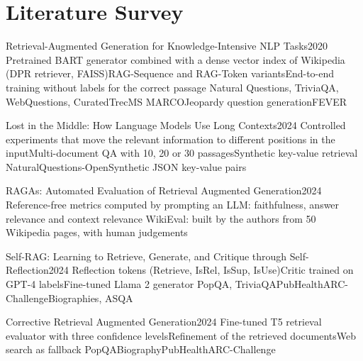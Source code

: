 \chapter{Literature Survey}\label{chap:literature}

  {Retrieval-Augmented Generation for Knowledge-Intensive NLP Tasks}{2020}
  {Pretrained BART generator combined with a dense vector index of Wikipedia (DPR retriever,
   FAISS)\newline RAG-Sequence and RAG-Token variants\newline End-to-end training without labels
   for the correct passage}
  {Natural Questions, TriviaQA, WebQuestions, CuratedTrec\newline MS MARCO\newline Jeopardy
   question generation\newline FEVER}

  {Lost in the Middle: How Language Models Use Long Contexts}{2024}
  {Controlled experiments that move the relevant information to different positions in the
   input\newline Multi-document QA with 10, 20 or 30 passages\newline Synthetic key-value
   retrieval}
  {NaturalQuestions-Open\newline Synthetic JSON key-value pairs}

  {RAGAs: Automated Evaluation of Retrieval Augmented Generation}{2024}
  {Reference-free metrics computed by prompting an LLM: faithfulness, answer relevance and context
   relevance}
  {WikiEval: built by the authors from 50 Wikipedia pages, with human judgements}

  {Self-RAG: Learning to Retrieve, Generate, and Critique through Self-Reflection}{2024}
  {Reflection tokens (Retrieve, IsRel, IsSup, IsUse)\newline Critic trained on GPT-4
   labels\newline Fine-tuned Llama 2 generator}
  {PopQA, TriviaQA\newline PubHealth\newline ARC-Challenge\newline Biographies, ASQA}

  {Corrective Retrieval Augmented Generation}{2024}
  {Fine-tuned T5 retrieval evaluator with three confidence levels\newline Refinement of the
   retrieved documents\newline Web search as fallback}
  {PopQA\newline Biography\newline PubHealth\newline ARC-Challenge}

